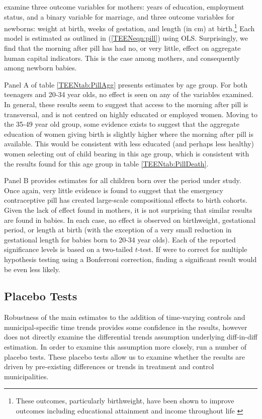\Person examine three outcome variables for mothers: years of education, 
employment status, and a binary variable for marriage, and three outcome variables
for newborns: weight at birth, weeks of gestation, and length (in cm) at 
birth.\footnote{These outcomes, particularly birthweight, have been shown to
improve outcomes including educational attainment and income throughout life 
\citep{BehrmanRosenzweig2004}}  Each model is estimated as outlined in 
(\ref{TEENeqn:pill}) using OLS.  Surprisingly, we find that the morning after
pill has had no, or very little, effect on aggregate human capital indicators.
This is the case among mothers, and consequently among newborn babies.

Panel A of table \ref{TEENtab:PillAgg} presents estimates by age group.  For
both teenagers and 20-34 year olds, no effect is seen on any of the variables
examined. In general, these results seem to suggest that access to the morning 
after pill is transversal, and is not centred on highly educated or employed 
women.  Moving to the 35-49 year old group, some evidence exists to suggest
that the aggregate education of women giving birth is slightly higher where
the morning after pill is available.  This would be consistent with less
educated (and perhaps less healthy) women selecting out of child bearing in
this age group, which is consistent with the results found for this age group
in table \ref{TEENtab:PillDeath}.

Panel B provides estimates for all children born over the period under study.
Once again, very little evidence is found to suggest that the emergency 
contraceptive pill has created large-scale compositional effects to birth
cohorts.  Given the lack of effect found in mothers, it is not surprising
that similar results are found in babies.  In each case, no effect is observed
on birthweight, gestational period, or length at birth (with the exception
of a very small reduction in gestational length for babies born to 20-34 year
olds).  Each of the reported significance levels is based on a two-tailed 
$t$-test.  If \person were to correct for multiple hypothesis testing using a
Bonferroni correction, finding a significant result would be even less likely.


\subsection{Placebo Tests}
\label{TEENsscn:placebo}
Robustness of the main estimates to the addition of time-varying controls and
municipal-specific time trends provides some confidence in the results, however 
does not directly examine the differential trends assumption underlying 
diff-in-diff estimation.  In order to examine this assumption more closely, 
\person run a number of placebo tests.  These placebo tests allow us to examine
whether the results are driven by pre-existing differences or trends in treatment
and control municipalities. 

